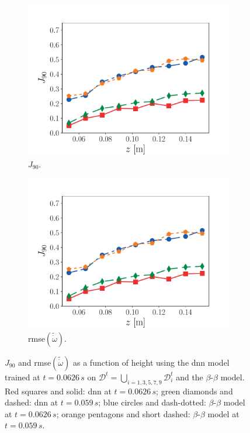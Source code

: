 \documentclass[review]{elsarticle}
\newcommand{\wt}[1]{\widetilde{#1}}
\begin{document}
\begin{figure}[!tbp]%
  \centering%
  \begin{subfigure}[t]{0.48\textwidth}%
    \includegraphics[page=1,width=\textwidth, trim=0.5cm 0cm 1.3cm 1.3cm, clip=true]{./figs/dice_predictions_comp_1030.pdf}%
    \caption{$J_{90}$.}%
  \end{subfigure}\hfill%
  \begin{subfigure}[t]{0.48\textwidth}%
    \includegraphics[page=2,width=\textwidth, trim=0.5cm 0cm 1.5cm 1.3cm, clip=true]{./figs/dice_predictions_comp_1030.pdf}%
    \caption{\gls{rmse}$(\wt{\dot{\omega}})$.}%
  \end{subfigure}%
  \caption{$J_{90}$ and \gls{rmse}$(\wt{\dot{\omega}})$ as a function
    of height using the \gls{dnn} model trained at
    $t=0.0626\,\unit{s}$ on
    $\mathcal{D}^t = \bigcup\limits_{i=1, 3, 5, 7, 9} \mathcal{D}_i^t$
    and the $\beta$-$\beta$ model. Red squares and solid: \gls{dnn} at
    $t=0.0626\,\unit{s}$; green diamonds and dashed: \gls{dnn} at
    $t=0.059\,\unit{s}$; blue circles and dash-dotted:
    $\beta$-$\beta$ model at $t=0.0626\,\unit{s}$; orange pentagons
    and short dashed: $\beta$-$\beta$ model at
    $t=0.059\,\unit{s}$.}\label{fig:prediction_comp_1030}%
\end{figure}%
\end{document}
